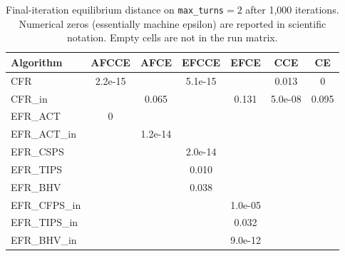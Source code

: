 \documentclass[11pt]{article}
\begin{document}
\begin{table}[H]
\centering
\caption{Final-iteration equilibrium distance on \texttt{max\_turns}$=2$ after 1{,}000 iterations. Numerical zeros (essentially machine epsilon) are reported in scientific notation. Empty cells are not in the run matrix.}
\label{tab:t2_results}
\begin{tabular}{lcccccc}
\toprule
Algorithm & AFCCE & AFCE & EFCCE & EFCE & CCE & CE \\
\midrule
CFR             & 2.2e-15 &         & 5.1e-15 &         & 0.013   & 0 \\
CFR\_in         &         & 0.065   &         & 0.131   & 5.0e-08 & 0.095 \\
EFR\_ACT        & 0       &         &         &         &         & \\
EFR\_ACT\_in    &         & 1.2e-14 &         &         &         & \\
EFR\_CSPS       &         &         & 2.0e-14 &         &         & \\
EFR\_TIPS       &         &         & 0.010   &         &         & \\
EFR\_BHV        &         &         & 0.038   &         &         & \\
EFR\_CFPS\_in   &         &         &         & 1.0e-05 &         & \\
EFR\_TIPS\_in   &         &         &         & 0.032   &         & \\
EFR\_BHV\_in    &         &         &         & 9.0e-12 &         & \\
\bottomrule
\end{tabular}
\end{table}
\end{document}
